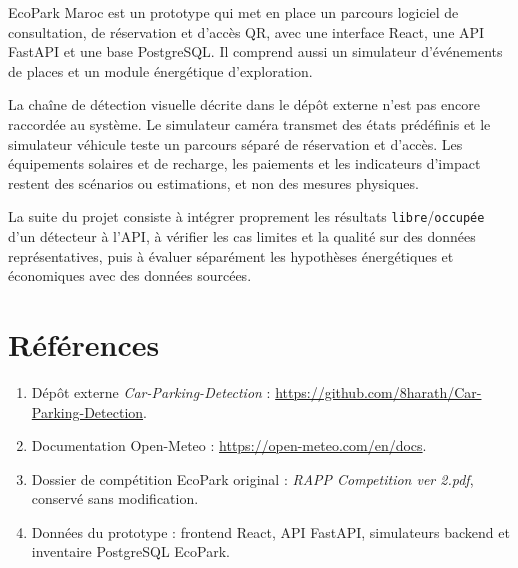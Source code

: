 \documentclass[12pt,a4paper]{report}
\begin{document}
EcoPark Maroc est un prototype qui met en place un parcours logiciel de consultation, de réservation et d'accès QR, avec une interface React, une API FastAPI et une base PostgreSQL. Il comprend aussi un simulateur d'événements de places et un module énergétique d'exploration.

La chaîne de détection visuelle décrite dans le dépôt externe n'est pas encore raccordée au système. Le simulateur caméra transmet des états prédéfinis et le simulateur véhicule teste un parcours séparé de réservation et d'accès. Les équipements solaires et de recharge, les paiements et les indicateurs d'impact restent des scénarios ou estimations, et non des mesures physiques.

La suite du projet consiste à intégrer proprement les résultats \texttt{libre}/\texttt{occupée} d'un détecteur à l'API, à vérifier les cas limites et la qualité sur des données représentatives, puis à évaluer séparément les hypothèses énergétiques et économiques avec des données sourcées.

\chapter*{Références}
\begin{enumerate}
  \item Dépôt externe \textit{Car-Parking-Detection} : \url{https://github.com/8harath/Car-Parking-Detection}.
  \item Documentation Open-Meteo : \url{https://open-meteo.com/en/docs}.
  \item Dossier de compétition EcoPark original : \textit{RAPP Competition ver 2.pdf}, conservé sans modification.
  \item Données du prototype : frontend React, API FastAPI, simulateurs backend et inventaire PostgreSQL EcoPark.
\end{enumerate}
\end{document}
